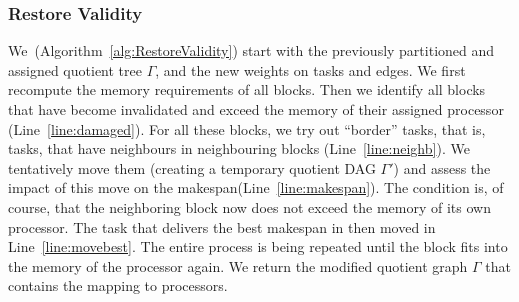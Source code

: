 \documentclass[sigconf,review,anonymous]{acmart}
\begin{document}
    \subsubsection{Restore Validity}
    We~(Algorithm~\ref{alg:RestoreValidity}) start with the previously partitioned and assigned quotient tree $\Gamma$,
    and the new weights on tasks and edges.
    We first recompute the memory requirements of all blocks.
    Then we identify all blocks that have become invalidated and exceed the memory of their assigned processor
    (Line~\ref{line:damaged}).
    For all these blocks, we try out ``border'' tasks, that is, tasks, that have neighbours in neighbouring blocks
    (Line~\ref{line:neighb}).
    We tentatively move them (creating a temporary quotient DAG $\Gamma'$) and assess the impact of this move on the
    makespan(Line~\ref{line:makespan}).
    The condition is, of course, that the neighboring block now does not exceed the memory of its own processor.
    The task that delivers the best makespan in then moved in Line~\ref{line:movebest}.
    The entire process is being repeated until the block fits into the memory of the processor again.
    We return the modified quotient graph $\Gamma$ that contains the mapping to processors.
\end{document}
